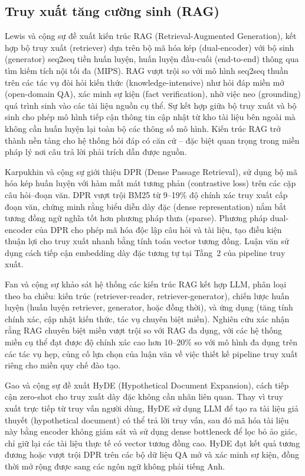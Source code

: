 \subsection{Truy xuất tăng cường sinh (RAG)}
\label{subsec:rag}

Lewis và cộng sự \cite{lewis2020rag} đề xuất kiến trúc RAG (Retrieval-Augmented
Generation), kết hợp bộ truy xuất (retriever) dựa trên bộ mã hóa kép (dual-encoder)
với bộ sinh (generator) seq2seq tiền huấn luyện, huấn luyện đầu-cuối
(end-to-end) thông qua tìm kiếm tích nội tối đa (MIPS). RAG vượt trội so với mô
hình seq2seq thuần trên các tác vụ đòi hỏi kiến thức (knowledge-intensive) như hỏi
đáp miền mở (open-domain QA), xác minh sự kiện (fact verification), nhờ việc neo
(grounding) quá trình sinh vào các tài liệu nguồn cụ thể. Sự kết hợp giữa bộ truy
xuất và bộ sinh cho phép mô hình tiếp cận thông tin cập nhật từ kho tài liệu bên
ngoài mà không cần huấn luyện lại toàn bộ các thông số mô hình. Kiến trúc RAG trở
thành nền tảng cho hệ thống hỏi đáp có căn cứ -- đặc biệt quan trọng trong miền
pháp lý nơi câu trả lời phải trích dẫn được nguồn.

Karpukhin và cộng sự \cite{karpukhin2020dpr} giới thiệu DPR (Dense Passage
Retrieval), sử dụng bộ mã hóa kép huấn luyện với hàm mất mát tương phản
(contrastive loss) trên các cặp câu hỏi--đoạn văn. DPR vượt trội BM25 từ
9--19\% độ chính xác truy xuất cấp đoạn văn, chứng minh rằng biểu diễn dày đặc
(dense representation) nắm bắt tương đồng ngữ nghĩa tốt hơn phương pháp thưa
(sparse). Phương pháp dual-encoder của DPR cho phép mã hóa độc lập câu hỏi và
tài liệu, tạo điều kiện thuận lợi cho truy xuất nhanh bằng tính toán vector tương
đồng. Luận văn sử dụng cách tiếp cận embedding dày đặc tương tự tại Tầng~2
của pipeline truy xuất.

Fan và cộng sự \cite{fan2024ragsurvey} khảo sát hệ thống các kiến trúc RAG kết
hợp LLM, phân loại theo ba chiều: kiến trúc (retriever-reader, retriever-generator),
chiến lược huấn luyện (huấn luyện retriever, generator, hoặc đồng thời), và ứng
dụng (tăng tính chính xác, cập nhật kiến thức, tác vụ chuyên biệt miền). Nghiên
cứu xác nhận rằng RAG chuyên biệt miền vượt trội so với RAG đa dụng, với các hệ
thống miền cụ thể đạt được độ chính xác cao hơn 10--20\% so với mô hình đa dụng
trên các tác vụ hẹp, củng cố lựa chọn của luận văn về việc thiết kế pipeline truy
xuất riêng cho miền quy chế đào tạo.

Gao và cộng sự \cite{gao2023hyde} đề xuất HyDE (Hypothetical Document Expansion),
cách tiếp cận zero-shot cho truy xuất dày đặc không cần nhãn liên quan. Thay vì
truy xuất trực tiếp từ truy vấn người dùng, HyDE sử dụng LLM để tạo ra tài liệu
giả thuyết (hypothetical document) có thể trả lời truy vấn, sau đó mã hóa tài liệu
này bằng encoder không giám sát và sử dụng dense bottleneck để lọc bỏ ảo giác, chỉ
giữ lại các tài liệu thực tế có vector tương đồng cao. HyDE đạt kết quả tương đương
hoặc vượt trội DPR trên các bộ dữ liệu QA mở và xác minh sự kiện, đồng thời mở
rộng được sang các ngôn ngữ không phải tiếng Anh.

